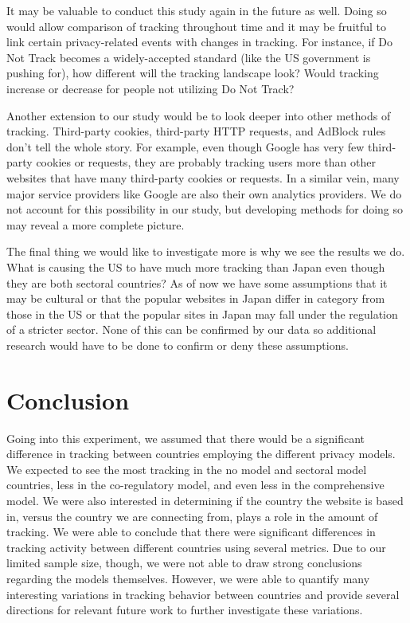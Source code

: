 \documentclass[conference]{IEEEtran}
\begin{document}
It may be valuable to conduct this study again in the future as well. Doing so would allow comparison of tracking throughout time and it may be fruitful to link certain privacy-related events with changes in tracking. For instance, if Do Not Track becomes a widely-accepted standard (like the US government is pushing for), how different will the tracking landscape look? Would tracking increase or decrease for people not utilizing Do Not Track?

Another extension to our study would be to look deeper into other methods of tracking. Third-party cookies, third-party HTTP requests, and AdBlock rules don't tell the whole story. For example, even though Google has very few third-party cookies or requests, they are probably tracking users more than other websites that have many third-party cookies or requests. In a similar vein, many major service providers like Google are also their own analytics providers. We do not account for this possibility in our study, but developing methods for doing so may reveal a more complete picture.

The final thing we would like to investigate more is why we see the results we do. What is causing the US to have much more tracking than Japan even though they are both sectoral countries? As of now we have some assumptions that it may be cultural or that the popular websites in Japan differ in category from those in the US or that the popular sites in Japan may fall under the regulation of a stricter sector. None of this can be confirmed by our data so additional research would have to be done to confirm or deny these assumptions.

\section{Conclusion}
Going into this experiment, we assumed that there would be a significant difference in tracking between countries employing the different privacy models. We expected to see the most tracking in the no model and sectoral model countries, less in the co-regulatory model, and even less in the comprehensive model. We were also interested in determining if the country the website is based in, versus the country we are connecting from, plays a role in the amount of tracking. We were able to conclude that there were significant differences in tracking activity between different countries using several metrics. Due to our limited sample size, though, we were not able to draw strong conclusions regarding the models themselves. However, we were able to quantify many interesting variations in tracking behavior between countries and provide several directions for relevant future work to further investigate these variations.
\end{document}
